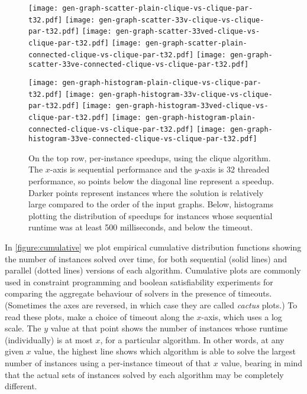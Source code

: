 \documentclass[sigconf]{acmart}
\begin{document}
\begin{figure*}[p]
    \texttt{[image: gen-graph-scatter-plain-clique-vs-clique-par-t32.pdf]}
    \hfill
    \texttt{[image: gen-graph-scatter-33v-clique-vs-clique-par-t32.pdf]}
    \hfill
    \texttt{[image: gen-graph-scatter-33ved-clique-vs-clique-par-t32.pdf]}
    \hfill
    \texttt{[image: gen-graph-scatter-plain-connected-clique-vs-clique-par-t32.pdf]}
    \hfill
    \texttt{[image: gen-graph-scatter-33ve-connected-clique-vs-clique-par-t32.pdf]}

    \vspace*{1em}

    \texttt{[image: gen-graph-histogram-plain-clique-vs-clique-par-t32.pdf]}
    \hfill
    \texttt{[image: gen-graph-histogram-33v-clique-vs-clique-par-t32.pdf]}
    \hfill
    \texttt{[image: gen-graph-histogram-33ved-clique-vs-clique-par-t32.pdf]}
    \hfill
    \texttt{[image: gen-graph-histogram-plain-connected-clique-vs-clique-par-t32.pdf]}
    \hfill
    \texttt{[image: gen-graph-histogram-33ve-connected-clique-vs-clique-par-t32.pdf]}

    \caption{On the top row, per-instance speedups, using the clique algorithm. The $x$-axis is
    sequential performance and the $y$-axis is 32 threaded performance, so points below the diagonal
    line represent a speedup. Darker points represent instances where the solution is relatively
    large compared to the order of the input graphs. Below, histograms plotting the distribution of
    speedups for instances whose sequential runtime was at least 500 milliseconds, and below the
    timeout.}\label{figure:cliquespeedups}
\end{figure*}

In \cref{figure:cumulative} we plot empirical cumulative distribution functions showing the number
of instances solved over time, for both sequential (solid lines) and parallel (dotted lines)
versions of each algorithm.  Cumulative plots are commonly used in constraint programming and
boolean satisfiability experiments for comparing the aggregate behaviour of solvers in the presence
of timeouts.  (Sometimes the axes are reversed, in which case they are called \emph{cactus} plots.)
To read these plots, make a choice of timeout along the $x$-axis, which uses a log scale. The $y$
value at that point shows the number of instances whose runtime (individually) is at most $x$, for a
particular algorithm. In other words, at any given $x$ value, the highest line shows which algorithm
is able to solve the largest number of instances using a per-instance timeout of that $x$ value,
bearing in mind that the actual sets of instances solved by each algorithm may be completely
different.
\end{document}
